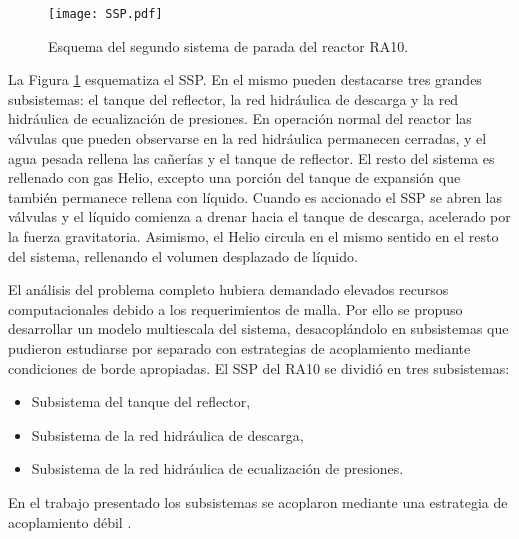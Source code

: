 \begin{figure}[ht]
\centering{}\texttt{[image: SSP.pdf]}
\caption{Esquema del segundo sistema de parada del reactor RA10.} \label{fig:SSP} 
\end{figure}

La Figura \ref{fig:SSP} esquematiza el SSP. 
En el mismo pueden destacarse tres grandes subsistemas: el tanque del reflector, la red hidráulica de descarga y
la red hidráulica de ecualización de presiones. 
En operación normal del reactor las
válvulas que pueden observarse en la red hidráulica permanecen cerradas, y el agua pesada rellena las cañerías y el tanque de reflector. 
El resto del sistema es rellenado con gas Helio, excepto una porción del tanque de expansión que también permanece rellena con líquido. 
Cuando es accionado el SSP se abren las válvulas y el líquido comienza a drenar hacia el tanque de descarga, acelerado por la fuerza gravitatoria. 
Asimismo, el Helio circula en el mismo sentido en el resto del sistema, rellenando el volumen desplazado de líquido.

El análisis del problema completo hubiera demandado elevados recursos computacionales debido a los requerimientos de malla.
Por ello se propuso desarrollar un modelo multiescala del sistema,
desacoplándolo en subsistemas que pudieron estudiarse por separado con estrategias de acoplamiento mediante condiciones de borde apropiadas.
El SSP del RA10 se dividió en tres subsistemas:

\begin{itemize}
\item Subsistema del tanque del reflector,
\item Subsistema de la red hidráulica de descarga,
\item Subsistema de la red hidráulica de ecualización de presiones.
\end{itemize}

En el trabajo presentado los subsistemas se acoplaron mediante una estrategia de acoplamiento débil \cite{ra10-paper} \cite{ra10-enief}.

